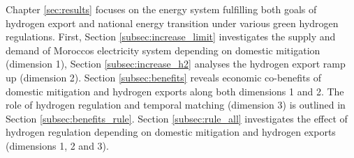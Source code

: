Chapter \ref{sec:results} focuses on the energy system fulfilling both goals of hydrogen export and national energy transition under various green hydrogen regulations. First, Section \ref{subsec:increase_limit} investigates the supply and demand of Moroccos electricity system depending on domestic mitigation (dimension 1), Section \ref{subsec:increase_h2} analyses the hydrogen export ramp up (dimension 2). Section \ref{subsec:benefits} reveals economic co-benefits of domestic mitigation and hydrogen exports along both dimensions 1 and 2. The role of hydrogen regulation and temporal matching (dimension 3) is outlined in Section \ref{subsec:benefits_rule}. Section \ref{subsec:rule_all} investigates the effect of hydrogen regulation depending on domestic mitigation and hydrogen exports (dimensions 1, 2 and 3).





